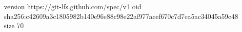 version https://git-lfs.github.com/spec/v1
oid sha256:c42609a3c1805982b140e96e88c98e22af977aeef670c7d7ea5ac34045a59c48
size 70
